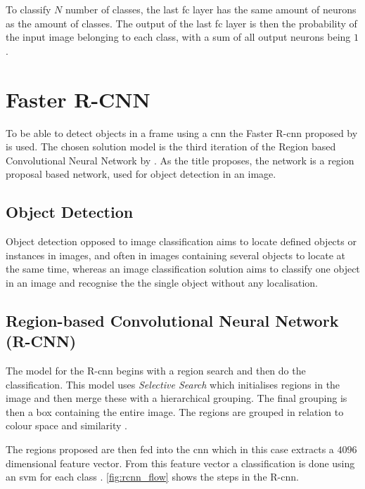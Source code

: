 To classify $N$ number of classes, the last \gls{fc} layer has the same amount of neurons as the amount of classes. The output of the last \gls{fc} layer is then the probability of the input image belonging to each class, with a sum of all output neurons being $1$ \citep{Karpathy2016b}.


\section{Faster R-CNN}
To be able to detect objects in a frame using a \gls{cnn} the Faster R-\gls{cnn} proposed by \cite{Ren2017} is used. The chosen solution model is the third iteration of the Region based Convolutional Neural Network by \cite{Girshick2014}. As the title proposes, the network is a region proposal based network, used for object detection in an image.

\subsection{Object Detection}
Object detection opposed to image classification aims to locate defined objects or instances in images, and often in images containing several objects to locate at the same time, whereas an image classification solution aims to classify one object in an image and recognise the the single object without any localisation.

\subsection{Region-based Convolutional Neural Network (R-CNN)} 
The model for the R-\gls{cnn} begins with a region search and then do the classification. This model uses \textit{Selective Search} which initialises regions in the image and then merge these with a hierarchical grouping. The final grouping is then a box containing the entire image. The regions are grouped in relation to colour space and similarity \citep{Girshick2014}.

The regions proposed are then fed into the \gls{cnn} which in this case extracts a $4096$ dimensional feature vector. From this feature vector a classification is done using an \gls{svm} for each class \citep{Girshick2014}. \autoref{fig:rcnn_flow} shows the steps in the R-\gls{cnn}.


